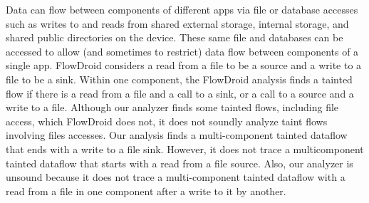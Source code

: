 {%
Data can flow between components of different apps via file or database accesses such as writes to and reads from shared external storage, 
internal storage, and shared public directories on the device. These same file and databases can be accessed to allow (and sometimes to restrict) data flow between components of a single app. 
FlowDroid considers a read from a file to be a source and a write to a file to be a sink. Within one component, the FlowDroid analysis finds a tainted flow if there is a read from a file and a call to a sink, or a call to a source and a write to a file. 
Although our analyzer finds some tainted flows, including file access, which FlowDroid does not, it does not soundly analyze taint flows involving files accesses.
Our analysis finds a multi-component tainted dataflow that ends with a write to a file sink. However, it does not trace a multicomponent tainted dataflow that starts with a read from a file source. Also, our analyzer is unsound because it does not trace a multi-component tainted dataflow with a read from a file in one component after a write to it by another.

}
